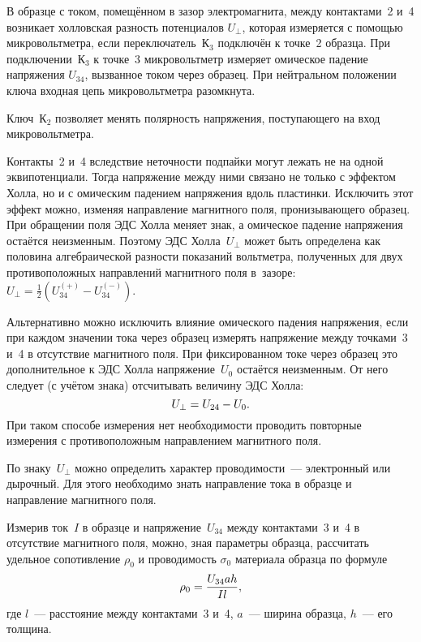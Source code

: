 В образце с током, помещённом в зазор электромагнита, между контактами~2 и~4
возникает холловская разность потенциалов $U_{\perp}$, которая измеряется с помощью
микровольтметра, если переключатель~К$_3$ подключён к точке~2 образца. При
подключении~К$_3$ к точке~3 микровольтметр измеряет омическое падение напряжения
$U_{34}$, вызванное током через образец. При нейтральном положении
ключа входная цепь микровольтметра разомкнута.

Ключ~К$_2$ позволяет менять полярность напряжения, поступающего на вход
микровольтметра.

Контакты~2 и~4 вследствие неточности подпайки могут лежать не на одной
эквипотенциали. Тогда напряжение между ними связано не только с эффектом
Холла, но и с омическим падением напряжения вдоль пластинки. 
Исключить этот эффект можно, изменяя направление магнитного поля, 
пронизывающего образец. 
При обращении поля ЭДС Холла меняет знак, а омическое падение напряжения
остаётся неизменным. Поэтому ЭДС Холла~$U_{\perp}$ может быть определена
как половина алгебраической разности показаний вольтметра, полученных для двух
противоположных направлений магнитного поля в~зазоре:
$U_{\perp} = \frac12 (U_{34}^{(+)}-U_{34}^{(-)})$.

Альтернативно можно исключить влияние омического падения напряжения, 
если при каждом значении тока через образец измерять напряжение
между точками~3 и~4 в отсутствие магнитного поля. При фиксированном токе через
образец это дополнительное к ЭДС Холла напряжение~$U_0$ остаётся неизменным. 
От него следует (с учётом знака) отсчитывать величину ЭДС Холла:
\begin{equation}
U_{\perp} = U_{24} - U_0.
\eqmark{3.5.1}
\end{equation}
При таком способе измерения нет необходимости проводить повторные измерения
с противоположным направлением магнитного поля.

По знаку~$U_{\perp}$ можно определить характер проводимости~--- электронный или
дырочный. Для этого необходимо знать направление тока в образце и направление
магнитного поля.

Измерив ток~$I$ в образце и напряжение~$U_{34}$ между контактами~3 и~4 в
отсутствие магнитного поля, можно, зная параметры образца, рассчитать удельное
сопотивление $\rho_0$ и проводимость $\sigma_0$ материала образца по формуле
\begin{equation}
	\rho_0=\frac{U_{34}ah}{Il},
	\eqmark{3.5.2}
\end{equation}
где $l$~--- расстояние между контактами~3 и~4, $a$~--- ширина образца, $h$~---
его толщина.

